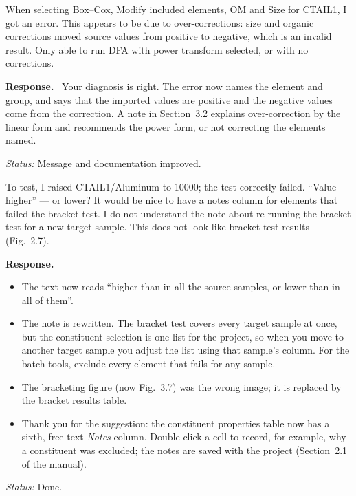 \documentclass[11pt]{article}
\newcounter{cmt}
\newcounter{grp}
\renewcommand{\thecmt}{\thegrp.\arabic{cmt}}
\newenvironment{reviewer}[1]{%
  \refstepcounter{cmt}%
  \begin{tcolorbox}[enhanced,breakable,colback=commentbg,colframe=usgsgreen!60,
    boxrule=0.4pt,left=6pt,right=6pt,top=4pt,bottom=4pt,
    title={\small\textbf{Comment \thecmt}\hfill\textit{#1}},
    coltitle=black,colbacktitle=usgsgreen!15,fonttitle=\small]}%
  {\end{tcolorbox}}
\newenvironment{response}{\par\noindent\textbf{Response.}\ }{\par\medskip}
\newcommand{\status}[1]{\par\noindent\textit{Status:} #1\par}
\begin{document}
\begin{reviewer}{Discriminant function analysis, step 4}
When selecting Box--Cox, Modify included elements, OM and Size for CTAIL1, I got
an error. This appears to be due to over-corrections: size and organic
corrections moved source values from positive to negative, which is an invalid
result. Only able to run DFA with power transform selected, or with no
corrections.
\end{reviewer}
\begin{response}
Your diagnosis is right. The error now names the element and group, and says
that the imported values are positive and the negative values come from the
correction. A note in Section~3.2 explains over-correction by the linear form
and recommends the power form, or not correcting the elements named.
\end{response}
\status{Message and documentation improved.}

\begin{reviewer}{Bracketing analysis}
To test, I raised CTAIL1/Aluminum to 10000; the test correctly failed. ``Value
higher'' — or lower? It would be nice to have a notes column for elements that
failed the bracket test. I do not understand the note about re-running the
bracket test for a new target sample. This does not look like bracket test
results (Fig.~2.7).
\end{reviewer}
\begin{response}
\begin{itemize}
    \item The text now reads ``higher than in all the source samples, or lower
          than in all of them''.
    \item The note is rewritten. The bracket test covers every target sample at
          once, but the constituent selection is one list for the project, so
          when you move to another target sample you adjust the list using
          that sample's column. For the batch tools, exclude every element that
          fails for any sample.
    \item The bracketing figure (now Fig.~3.7) was the wrong image; it is
          replaced by the bracket results table.
    \item Thank you for the suggestion: the constituent properties table now
          has a sixth, free-text \textit{Notes} column. Double-click a cell
          to record, for example, why a constituent was excluded; the notes
          are saved with the project (Section~2.1 of the manual).
\end{itemize}
\end{response}
\status{Done.}
\end{document}
